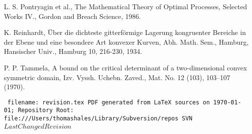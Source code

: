 \documentclass[11pt]{amsart}
\def\svninfo{{\tt
  filename: revision.tex\hfill\break
  PDF generated from LaTeX sources on \today; \hfill\break
  Repository Root: file:///Users/thomashales/Library/Subversion/repos
  SVN $LastChangedRevision$
  }
  }
\begin{document}
\begin{thebibliography}{}
 L. S. Pontryagin et al., The Mathematical Theory of Optimal Processes, Selected Works IV., Gordon and Breach Science, 1986.

 K. Reinhardt, \"Uber die dichteste gitterf\"ormige Lagerung
kongruenter Bereiche in der Ebene und eine besondere Art konvexer Kurven, Abh. Math. Sem., Hamburg, Hansischer Univ., Hamburg 10, 216-230, 1934.

 P. P. Tammela, A bound on the critical determinant of a two-dimensional convex symmetric domain,  Izv. Vyssh. Uchebn. Zaved., Mat. No. 12 (103), 103--107 (1970).




\end{thebibliography}

\svninfo
\end{document}
